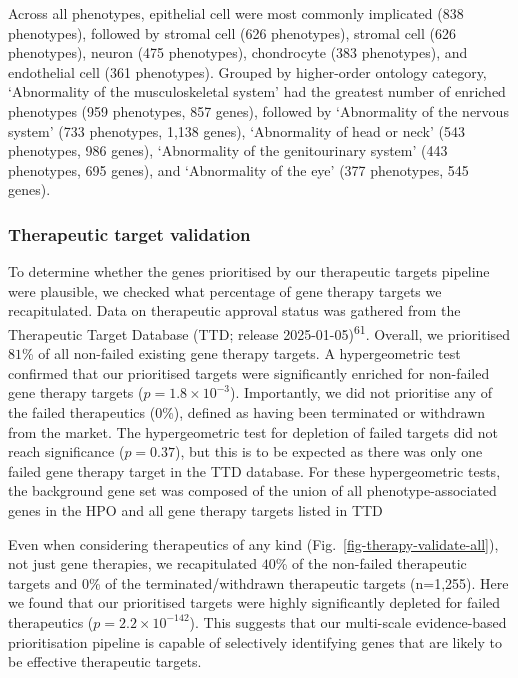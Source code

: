 \documentclass[
]{article}
\begin{document}
Across all phenotypes, epithelial cell were most commonly implicated
(838 phenotypes), followed by stromal cell (626 phenotypes), stromal
cell (626 phenotypes), neuron (475 phenotypes), chondrocyte (383
phenotypes), and endothelial cell (361 phenotypes). Grouped by
higher-order ontology category, `Abnormality of the musculoskeletal
system' had the greatest number of enriched phenotypes (959 phenotypes,
857 genes), followed by `Abnormality of the nervous system' (733
phenotypes, 1,138 genes), `Abnormality of head or neck' (543 phenotypes,
986 genes), `Abnormality of the genitourinary system' (443 phenotypes,
695 genes), and `Abnormality of the eye' (377 phenotypes, 545 genes).

\subsubsection{Therapeutic target
validation}\label{therapeutic-target-validation}

To determine whether the genes prioritised by our therapeutic targets
pipeline were plausible, we checked what percentage of gene therapy
targets we recapitulated. Data on therapeutic approval status was
gathered from the Therapeutic Target Database (TTD; release
2025-01-05)\textsuperscript{61}. Overall, we prioritised \(81\)\% of all
non-failed existing gene therapy targets. A hypergeometric test
confirmed that our prioritised targets were significantly enriched for
non-failed gene therapy targets (\(p=\)\(1.8 \times 10^{-3}\)).
Importantly, we did not prioritise any of the failed therapeutics (0\%),
defined as having been terminated or withdrawn from the market. The
hypergeometric test for depletion of failed targets did not reach
significance (\(p=\)\(0.37\)), but this is to be expected as there was
only one failed gene therapy target in the TTD database. For these
hypergeometric tests, the background gene set was composed of the union
of all phenotype-associated genes in the HPO and all gene therapy
targets listed in TTD

Even when considering therapeutics of any kind
(Fig.~\ref{fig-therapy-validate-all}), not just gene therapies, we
recapitulated \(40\)\% of the non-failed therapeutic targets and 0\% of
the terminated/withdrawn therapeutic targets (n=1,255). Here we found
that our prioritised targets were highly significantly depleted for
failed therapeutics (\(p=\)\(2.2 \times 10^{-142}\)). This suggests that
our multi-scale evidence-based prioritisation pipeline is capable of
selectively identifying genes that are likely to be effective
therapeutic targets.
\end{document}
